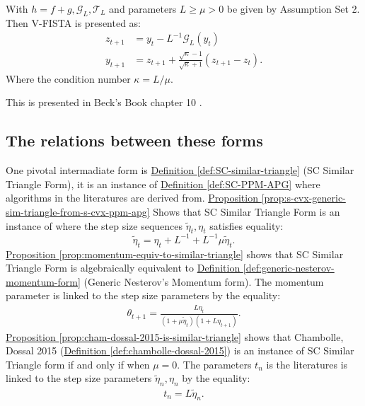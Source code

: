 \documentclass[12pt]{article}
\begin{document}
        \begin{definition}[V-FISTA]\label{def:v-fista}
            With $h = f + g, \mathcal G_L, \mathcal T_L$ and parameters $L \ge \mu > 0$  be given by Assumption Set 2. 
            Then V-FISTA is presented as: 
            \begin{align*}
                z_{t + 1} 
                &= y_t - L^{-1}\mathcal G_L(y_t)
                \\
                y_{t + 1} &= z_{t + 1} + 
                \frac{\sqrt{\kappa} - 1}{\sqrt{\kappa} + 1}
                (z_{t +1} - z_t). 
            \end{align*}
            Where the condition number $\kappa = L/\mu$. 
        \end{definition}
        \begin{remark}
            This is presented in Beck's Book chapter 10 \cite[(10.7.7)]{beck_first-order_2017}. 
        \end{remark}

    \subsection{The relations between these forms}\label{sec:relations-between-forms}
        One pivotal intermadiate form is 
        \hyperref[def:SC-similar-triangle]
        { Definition \ref*{def:SC-similar-triangle}} 
        (SC Similar Triangle Form), it is an instance of
        \hyperref[def:SC-PPM-APG]
        {Definition \ref*{def:SC-PPM-APG}}
        where algorithms in the literatures are derived from. 
        \hyperref[prop:s-cvx-generic-sim-triangle-from-s-cvx-ppm-apg]
        {Proposition \ref*{prop:s-cvx-generic-sim-triangle-from-s-cvx-ppm-apg}}
        Shows that SC Similar Triangle Form is an instance of \SCPPMAPG where the step size sequences $\tilde \eta_t, \eta_t$ satisfies equality: 
        $$
            \tilde \eta_t =\eta_t + L^{-1} + L^{-1}\mu \tilde \eta_t. 
        $$
        \hyperref[prop:momentum-equiv-to-similar-triangle]
        {Proposition \ref*{prop:momentum-equiv-to-similar-triangle}}
        shows that SC Similar Triangle Form is algebraically equivalent to 
        \hyperref[def:generic-nesterov-momentum-form]{Definition \ref*{def:generic-nesterov-momentum-form}} (Generic Nesterov's Momentum form).
        The momentum parameter is linked to the step size parameters by the equality: 
        \begin{align*}
            \theta_{t + 1} = \frac{L\eta_t}{(1 + \mu \tilde\eta_{t})(1 + L\eta_{t + 1})}.
        \end{align*} 
        \hyperref[prop:cham-dossal-2015-is-similar-triangle]
        {Proposition \ref{prop:cham-dossal-2015-is-similar-triangle}}
        shows that Chambolle, Dossal 2015 (\hyperref[def:chambolle-dossal-2015]
            {Definition \ref*{def:chambolle-dossal-2015}})
        is an instance of SC Similar Triangle form if and only if when $\mu = 0$. 
        The parameters $t_n$ is the literatures is linked to the step size parameters $\tilde \eta_n, \eta_n$ by the equality: 
        \begin{align*}
            t_n = L \tilde \eta_n. 
        \end{align*}
\end{document}
